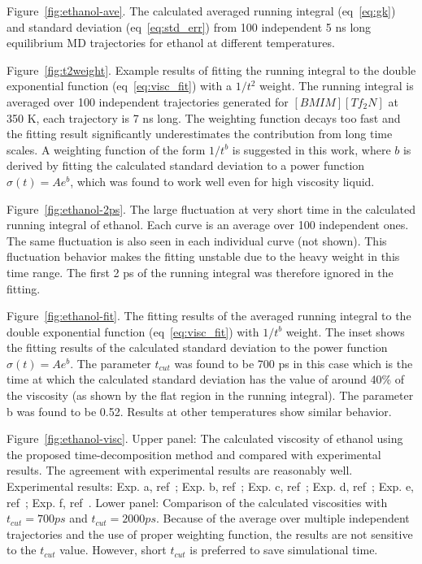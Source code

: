 \documentclass[12pt]{article}
\begin{document}
Figure~\ref{fig:ethanol-ave}.
The calculated averaged running integral (eq~\ref{eq:gk})
and standard deviation (eq~\ref{eq:std_err}) 
from 100 independent 5 ns long equilibrium MD trajectories for ethanol at different temperatures.

Figure~\ref{fig:t2weight}.
Example results of fitting the running integral to the double exponential function (eq~\ref{eq:visc_fit}) with a $1/t^2$ weight.
The running integral is averaged over 100 independent trajectories generated for $[BMIM][Tf_2N]$ at 350 K,
each trajectory is 7 ns long.
The weighting function decays too fast and the fitting result significantly underestimates the contribution from long time scales.
A weighting function of the form $1/t^b$ is suggested in this work,
where $b$ is derived by fitting the calculated standard deviation to a power function $\sigma(t) = Ae^b$,
which was found to work well even for high viscosity liquid.

Figure~\ref{fig:ethanol-2ps}.
The large fluctuation at very short time in the calculated running integral of ethanol.
Each curve is an average over 100 independent ones.
The same fluctuation is also seen in each individual curve (not shown).
This fluctuation behavior makes the fitting unstable due to the heavy weight in this time range.
The first 2 ps of the running integral was therefore ignored in the fitting.

Figure~\ref{fig:ethanol-fit}.
The fitting results of the averaged running integral to the double exponential function (eq~\ref{eq:visc_fit}) with $1/t^b$ weight.
The inset shows the fitting results of the calculated standard deviation to the power function $\sigma(t) = Ae^b$.
The parameter $t_{cut}$ was found to be 700 ps in this case
which is the time at which the calculated standard deviation has the value of around 40\% of the viscosity 
(as shown by the flat region in the running integral).
The parameter b was found to be 0.52.
Results at other temperatures show similar behavior.

Figure~\ref{fig:ethanol-visc}.
Upper panel: The calculated viscosity of ethanol using the proposed time-decomposition method
and compared with experimental results.
The agreement with experimental results are reasonably well.
Experimental results: 
Exp. a, ref~\cite{Jouyban.KJCE.29.812.2012};
Exp. b, ref~\cite{Nain.JML.140.108.2008};
Exp. c, ref~\cite{Bhuiyan.JML.138.139.2008};
Exp. d, ref~\cite{Fonseca.JCED.52.1240.2007};
Exp. e, ref~\cite{Taboas.JCED.51.940.2006};
Exp. f, ref~\cite{Tojo.JCED.49.1590.2004}.
Lower panel: Comparison of the calculated viscosities with $t_{cut}=700 ps$ and $t_{cut}=2000 ps$.
Because of the average over multiple independent trajectories and the use of proper weighting function,
the results are not sensitive to the $t_{cut}$ value.
However, short $t_{cut}$ is preferred to save simulational time. 
\end{document}

